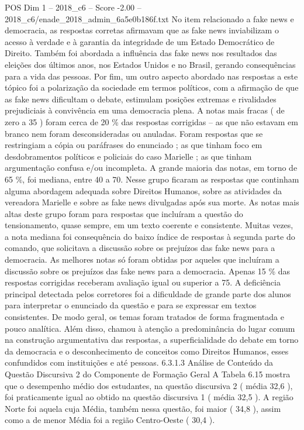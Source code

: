 \begin{textsample}{POS Dim 1 – 2018\_c6 – Score -2.00 – 2018\_c6/enade\_2018\_admin\_6a5e0b186f.txt}
No item relacionado a fake news e democracia, as respostas corretas afirmavam que as fake news inviabilizam o acesso à verdade e à garantia da integridade de um Estado Democrático de Direito.
Também foi abordada a influência das fake news nos resultados das eleições dos últimos anos, nos Estados Unidos e no Brasil, gerando consequências para a vida das pessoas.
Por fim, um outro aspecto abordado nas respostas a este tópico foi a polarização da sociedade em termos políticos, com a afirmação de que as fake news dificultam o debate, estimulam posições extremas e rivalidades prejudiciais à convivência em uma democracia plena.
A notas mais fracas ( de zero a 35 ) foram cerca de 20 \% das respostas corrigidas – as que não estavam em branco nem foram desconsideradas ou anuladas.
Foram respostas que se restringiam a cópia ou paráfrases do enunciado ; as que tinham foco em desdobramentos políticos e policiais do caso Marielle ; as que tinham argumentação confusa e/ou incompleta.
A grande maioria das notas, em torno de 65 \%, foi mediana, entre 40 a 70.
Nesse grupo ficaram as respostas que continham alguma abordagem adequada sobre Direitos Humanos, sobre as atividades da vereadora Marielle e sobre as fake news divulgadas após sua morte.
As notas mais altas deste grupo foram para respostas que incluíram a questão do tensionamento, quase sempre, em um texto coerente e consistente.
Muitas vezes, a nota mediana foi consequência do baixo índice de respostas à segunda parte do comando, que solicitava a discussão sobre os prejuízos das fake news para a democracia.
As melhores notas só foram obtidas por aqueles que incluíram a discussão sobre os prejuízos das fake news para a democracia.
Apenas 15 \% das respostas corrigidas receberam avaliação igual ou superior a 75.
A deficiência principal detectada pelos corretores foi a dificuldade de grande parte dos alunos para interpretar o enunciado da questão e para se expressar em textos consistentes.
De modo geral, os temas foram tratados de forma fragmentada e pouco analítica.
Além disso, chamou à atenção a predominância do lugar comum na construção argumentativa das respostas, a superficialidade do debate em torno da democracia e o desconhecimento de conceitos como Direitos Humanos, esses confundidos com instituições e até pessoas. 6.3.1.3 Análise de Conteúdo da Questão Discursiva 2 do Componente de Formação Geral A Tabela 6.15 mostra que o desempenho médio dos estudantes, na questão discursiva 2 ( média 32,6 ), foi praticamente igual ao obtido na questão discursiva 1 ( média 32,5 ).
A região Norte foi aquela cuja Média, também nessa questão, foi maior ( 34,8 ), assim como a de menor Média foi a região Centro-Oeste ( 30,4 ).

\end{textsample}
